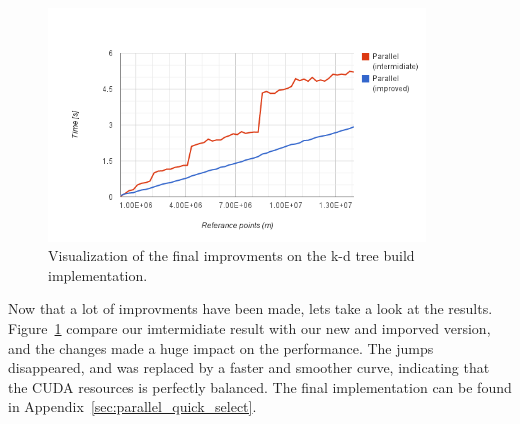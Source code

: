 \begin{figure}[ht!]
\centering
\includegraphics[width=100mm]{../gfx/the_jumps_final.png}
\caption{Visualization of the final improvments on the k-d tree build implementation.}
\label{fig:the_jumps_final}
\end{figure}

Now that a lot of improvments have been made, lets take a look at the results. Figure~\ref{fig:the_jumps_final} compare our imtermidiate result with our new and imporved version, and the changes made a huge impact on the performance. The jumps disappeared, and was replaced by a faster and smoother curve, indicating that the CUDA resources is perfectly balanced. The final implementation can be found in Appendix~\ref{sec:parallel_quick_select}.
